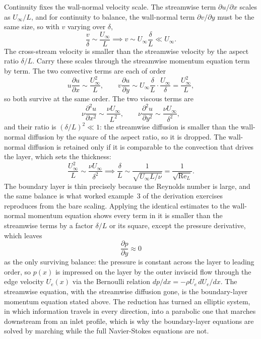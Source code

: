 Continuity fixes the wall-normal velocity scale. The streamwise term
$\partial u/\partial x$ scales as $U_\infty/L$, and for continuity to
balance, the wall-normal term $\partial v/\partial y$ must be the same
size, so with $v$ varying over $\delta$,
\[
\frac{v}{\delta} \sim \frac{U_\infty}{L} \implies v \sim U_\infty
\frac{\delta}{L} \ll U_\infty.
\]
The cross-stream velocity is smaller than the streamwise velocity by
the aspect ratio $\delta/L$. Carry these scales through the streamwise
momentum equation term by term. The two convective terms are each of
order
\[
u\frac{\partial u}{\partial x} \sim \frac{U_\infty^2}{L}, \qquad
v\frac{\partial u}{\partial y} \sim U_\infty\frac{\delta}{L}\cdot
\frac{U_\infty}{\delta} = \frac{U_\infty^2}{L},
\]
so both survive at the same order. The two viscous terms are
\[
\nu\frac{\partial^2 u}{\partial x^2} \sim \frac{\nu U_\infty}{L^2},
\qquad
\nu\frac{\partial^2 u}{\partial y^2} \sim \frac{\nu U_\infty}{\delta^2},
\]
and their ratio is $(\delta/L)^2 \ll 1$: the streamwise diffusion is
smaller than the wall-normal diffusion by the square of the aspect
ratio, so it is dropped. The wall-normal diffusion is retained only if
it is comparable to the convection that drives the layer, which sets
the thickness:
\[
\frac{U_\infty^2}{L} \sim \frac{\nu U_\infty}{\delta^2} \implies
\frac{\delta}{L} \sim \frac{1}{\sqrt{U_\infty L/\nu}} =
\frac{1}{\sqrt{\text{Re}_L}}.
\]
The boundary layer is thin precisely because the Reynolds number is
large, and the same balance is what worked example~3 of the derivation
exercises reproduces from the bare scaling. Applying the identical
estimates to the wall-normal momentum equation shows every term in it
is smaller than the streamwise terms by a factor $\delta/L$ or its
square, except the pressure derivative, which leaves
\[
\frac{\partial p}{\partial y} \approx 0
\]
as the only surviving balance: the pressure is constant across the
layer to leading order, so $p(x)$ is impressed on the layer by the
outer inviscid flow through the edge velocity $U_e(x)$ via the
Bernoulli relation $dp/dx = -\rho U_e\,dU_e/dx$. The streamwise
equation, with the streamwise diffusion gone, is the boundary-layer
momentum equation stated above. The reduction has turned an elliptic
system, in which information travels in every direction, into a
parabolic one that marches downstream from an inlet profile, which is
why the boundary-layer equations are solved by marching while the full
Navier-Stokes equations are not.



